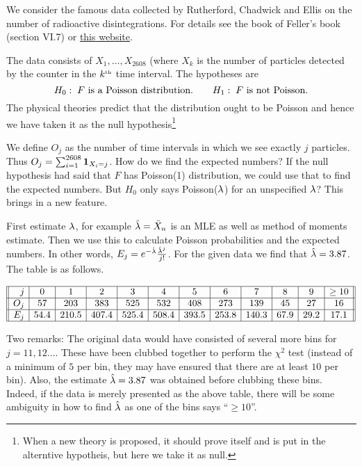 \documentclass[preprint,  11pt]{amsart}
\begin{document}
 We consider the famous data collected by Rutherford, Chadwick and Ellis on the number of radioactive disintegrations. For details see the book of Feller's book (section VI.7) or \href{http://galton.uchicago.edu/~lalley/Courses/312/PoissonProcesses.pdf}{this website}.

The data consists of $X_{1},\ldots ,X_{2608}$ (where $X_{k}$ is the number of particles detected by the counter in the $k^{\mbox{\tiny th}}$ time interval. The hypotheses are
 $$
 H_{0}: \; F \mbox{ is a Poisson distribution}. \qquad H_{1}: \; F \mbox{ is not Poisson}.
 $$
The physical theories predict that the distribution ought to be Poisson and hence we have taken it as the null hypothesis\footnote{When a new theory is proposed, it should prove itself and is put in the alterntive hypotheis, but here we take it as null.}

We define $O_{j}$ as the number of time intervals in which we see exactly $j$ particles. Thus $O_{j}=\sum_{i=1}^{2608}{\mathbf 1}_{X_{i}=j}$. How do we find the expected numbers? If the null hypothesis had said that $F$ has Poisson(1) distribution, we could use that to find the expected numbers. But $H_{0}$ only says Poisson($\lambda$) for an unspecified $\lambda$? This brings in a new feature.

First estimate $\lambda$, for example $\hat{\lambda}=\bar{X}_{n}$ is an MLE as well as method of moments estimate. Then we use this to calculate Poisson probabilities and the expected numbers. In other words, $E_{j}=e^{-\hat{\lambda}}\frac{\hat{\lambda}^{j}}{j!}$. For the given data we find that $\hat{\lambda}=3.87$. The table is as follows.

\[
\begin{array}{||r|c|c|c|c|c|c|c|c|c|c|c||}
\hline
j  & 0 & 1 & 2 & 3 & 4 & 5 & 6 & 7 & 8 & 9 & \ge 10 \\
\hline
O_{j}  & 57 & 203 & 383 & 525 & 532 & 408 & 273 & 139 & 45 & 27 & 16 \\
\hline
E_{j} & 54.4 & 210.5 & 407.4 & 525.4 & 508.4 & 393.5 & 253.8 & 140.3 & 67.9 & 29.2 & 17.1 \\
\hline
\end{array}
\]

Two remarks: The original data would have consisted of several more bins for $j=11,12\ldots$. These have been clubbed together to perform the $\chi^{2}$ test (instead of a minimum of $5$ per bin, they may have ensured that there are at least $10$ per bin). Also, the estimate $\hat{\lambda}=3.87$ was obtained before clubbing these bins. Indeed, if the data is merely presented as the above table, there will be some ambiguity in how to find $\hat{\lambda}$ as one of the bins says ``$\ge 10$''.
\end{document}
